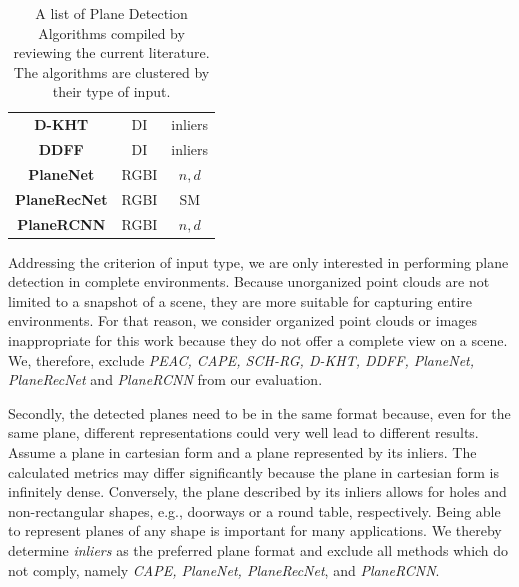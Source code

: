 \documentclass[main.tex]{subfiles}
\begin{document}
\begin{table}[H]
\begin{tabular}{c|c|c}
        \textbf{D-KHT}  \cite{Vera_Lucio_Fernandes_Velho_2018}           & DI                  & inliers               \\  %
        \textbf{DDFF} \cite{Roychoudhury_Missura_Bennewitz_2021}         & DI                  & inliers               \\  %
        \textbf{PlaneNet} \cite{Liu_Yang_Ceylan_Yumer_Furukawa_2018}     & RGBI                & $n, d$                \\  %
        \textbf{PlaneRecNet} \cite{Xie_Shu_Rambach_Pagani_Stricker_2022} & RGBI                & SM                    \\  %
        \textbf{PlaneRCNN} \cite{Liu_Kim_Gu_Furukawa_Kautz_2019}         & RGBI                & $n, d$                \\  %
    \end{tabular}
    \caption{A list of Plane Detection Algorithms compiled by reviewing the current literature. The algorithms are clustered by their type of input.}
    \label{tab:algos}
\end{table}

Addressing the criterion of input type, we are only interested in performing plane detection in complete environments.
Because unorganized point clouds are not limited to a snapshot of a scene, they are more suitable for capturing entire environments.
For that reason, we consider organized point clouds or images inappropriate for this work because they do not offer a complete view on a scene.
We, therefore, exclude  \textit{PEAC, CAPE, SCH-RG, D-KHT, DDFF, PlaneNet, PlaneRecNet} and \textit{PlaneRCNN} from our evaluation.

Secondly, the detected planes need to be in the same format because, even for the same plane, different representations could very well lead to different results.
Assume a plane in cartesian form and a plane represented by its inliers. The calculated metrics may differ significantly because the plane in cartesian form is infinitely dense.
Conversely, the plane described by its inliers allows for holes and non-rectangular shapes, e.g., doorways or a round table, respectively.
Being able to represent planes of any shape is important for many applications.
We thereby determine \textit{inliers} as the preferred plane format and exclude all methods which do not comply, namely \textit{CAPE, PlaneNet, PlaneRecNet}, and \textit{PlaneRCNN}.
\end{document}
